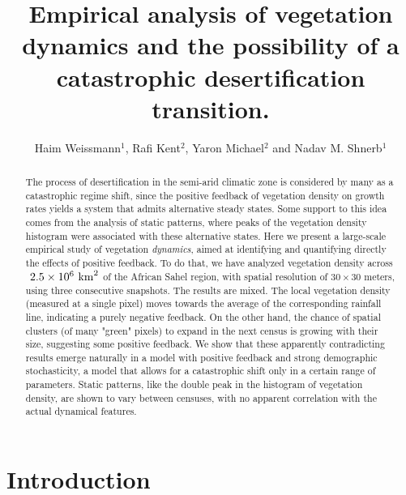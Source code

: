 \documentclass[aps,pre,twocolumn]{revtex4-1}
\begin{document}
\title{Empirical analysis of vegetation dynamics and the possibility of a catastrophic desertification transition.}

\author{Haim Weissmann$^1$,  Rafi Kent$^2$, Yaron Michael$^2$ and Nadav M. Shnerb$^1$}




\begin{abstract}
The process of desertification in the semi-arid climatic zone is considered by many as a catastrophic regime shift, since the positive feedback of vegetation density on growth rates yields a system that admits alternative steady states. Some support to this idea comes from the analysis of static patterns, where peaks of the vegetation density histogram were associated with these alternative states. Here we present a large-scale empirical study of vegetation \emph{dynamics}, aimed at identifying and quantifying directly the effects of positive feedback. To do that, we have analyzed vegetation density across  $~2.5 \times 10^6 \  \rm{km}^2$ of the African Sahel region, with spatial resolution of $30 \times 30$ meters, using three consecutive snapshots. The results are mixed. The local vegetation density (measured at a single pixel) moves towards the average of the corresponding rainfall line, indicating a purely negative feedback. On the other hand, the chance of spatial clusters (of many "green" pixels) to expand in the next census is growing with their size, suggesting some positive feedback.  We show that these apparently contradicting results emerge naturally in a model with positive feedback and strong demographic stochasticity, a model that allows for a catastrophic shift only in a certain range of parameters.  Static patterns, like the double peak in the histogram of vegetation density, are shown to vary between censuses, with no apparent correlation with the actual dynamical features.
\end{abstract}

\maketitle

\section{Introduction}
\end{document}
